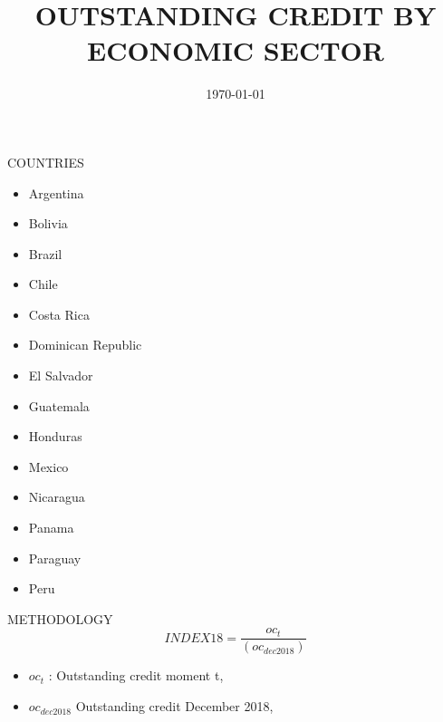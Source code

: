 \documentclass{beamer}
\title[Credit Type]{OUTSTANDING CREDIT BY ECONOMIC SECTOR}
\date{\today}
\begin{document}
	\begin{frame}
		\begin{center}
		\end{center}
	\end{frame}

\begin{frame}
    COUNTRIES
    \begin{multicols}{3}
	\begin{itemize}
		\item Argentina
		\item Bolivia
		\item Brazil
		\item Chile
		\item Costa Rica
		\item Dominican Republic
		\item El Salvador
		\item Guatemala
		\item Honduras
		\item Mexico
		\item Nicaragua
		\item Panama
		\item Paraguay
		\item Peru
	\end{itemize}
\end{multicols}	
\end{frame}
%
\begin{frame}
	METHODOLOGY
	\begin{equation}
	INDEX18=\frac{oc_{t}}{(oc_{dec2018})}
	\end{equation}
	{\footnotesize
		\begin{itemize}
			\item $oc_{t}$ : Outstanding credit moment t,
			\item $oc_{dec2018}$ Outstanding credit December 2018,
	\end{itemize}}
\end{frame}
\end{document}

